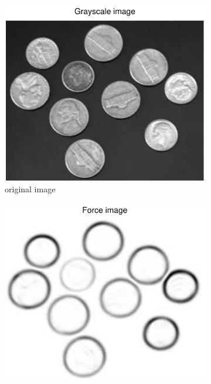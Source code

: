 \documentclass[11pt,a4paper]{article}
\begin{document}
\begin{figure}[H]
    \centering
    \begin{subfigure}[t]{0.48\textwidth}
        \includegraphics[width=\textwidth]{src/images/coins_gradient_gray.pdf}
        \caption{original image}
        \label{fig:coins_original}
    \end{subfigure}
    \begin{subfigure}[t]{0.48\textwidth}
        \includegraphics[width=\textwidth]{src/images/coins_gradient_forces.pdf}

\end{subfigure}
\end{figure}
\end{document}
